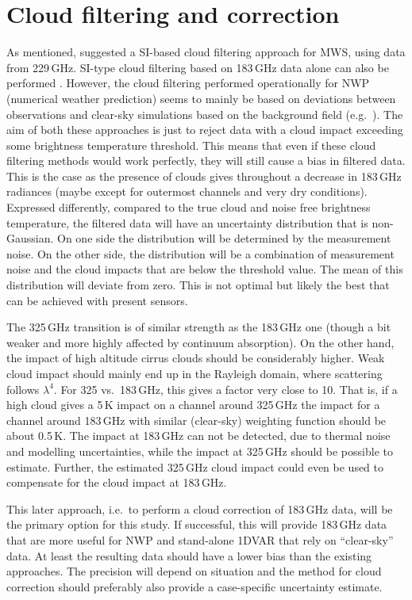 \documentclass[BCOR=1cm,12pt,bibliography=totoc]{article}
\begin{document}
\section{Cloud filtering and correction}
\label{sec:clouds}
%
As mentioned, \citet{rekha2012potential} suggested a SI-based cloud filtering
approach for MWS, using data from 229\,GHz. SI-type cloud filtering based on
183\,GHz data alone can also be performed \citep{buehler:aclou:07}. However,
the cloud filtering performed operationally for NWP (numerical weather
prediction) seems to mainly be based on deviations between observations and
clear-sky simulations based on the background field (e.g.\
\citet{chambon2015investigating}). The aim of both these approaches is just to
reject data with a cloud impact exceeding some brightness temperature
threshold. This means that even if these cloud filtering methods would work
perfectly, they will still cause a bias in filtered data. This is the case as
the presence of clouds gives throughout a decrease in 183\,GHz radiances (maybe
except for outermost channels and very dry conditions). Expressed differently,
compared to the true cloud and noise free brightness temperature, the filtered
data will have an uncertainty distribution that is non-Gaussian. On one side
the distribution will be determined by the measurement noise. On the other
side, the distribution will be a combination of measurement noise and the cloud
impacts that are below the threshold value. The mean of this distribution will
deviate from zero. This is not optimal but likely the best that can be achieved
with present sensors.

The 325\,GHz transition is of similar strength as the 183\,GHz one (though a
bit weaker and more highly affected by continuum absorption). On the other
hand, the impact of high altitude cirrus clouds should be considerably higher.
Weak cloud impact should mainly end up in the Rayleigh domain, where
scattering follows $\lambda^4$. For 325 vs.\ 183\,GHz, this gives a factor very
close to 10. That is, if a high cloud gives a 5\,K impact on a channel around
325\,GHz the impact for a channel around 183\,GHz with similar (clear-sky)
weighting function should be about 0.5\,K. The impact at 183\,GHz can not be
detected, due to thermal noise and modelling uncertainties, while the impact at
325\,GHz should be possible to estimate. Further, the estimated 325\,GHz cloud
impact could even be used to compensate for the cloud impact at 183\,GHz.

This later approach, i.e.\ to perform a cloud correction of 183\,GHz data, will
be the primary option for this study. If successful, this will provide 183\,GHz
data that are more useful for NWP and stand-alone 1DVAR that rely on
``clear-sky'' data. At least the resulting data should have a lower bias than
the existing approaches. The precision will depend on situation and the method
for cloud correction should preferably also provide a case-specific uncertainty
estimate.
\end{document}
